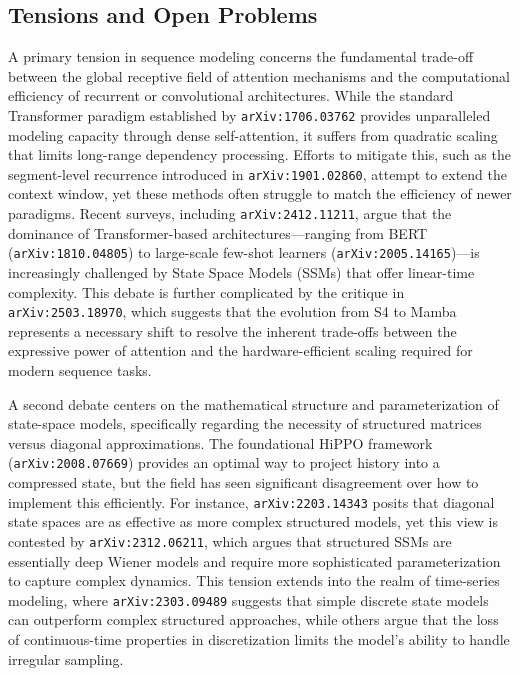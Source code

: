 \documentclass[11pt]{article}
\begin{document}
\subsection{Tensions and Open Problems}

A primary tension in sequence modeling concerns the fundamental trade-off between the global receptive field of attention mechanisms and the computational efficiency of recurrent or convolutional architectures. While the standard Transformer paradigm established by \texttt{arXiv:1706.03762} provides unparalleled modeling capacity through dense self-attention, it suffers from quadratic scaling that limits long-range dependency processing. Efforts to mitigate this, such as the segment-level recurrence introduced in \texttt{arXiv:1901.02860}, attempt to extend the context window, yet these methods often struggle to match the efficiency of newer paradigms. Recent surveys, including \texttt{arXiv:2412.11211}, argue that the dominance of Transformer-based architectures—ranging from BERT (\texttt{arXiv:1810.04805}) to large-scale few-shot learners (\texttt{arXiv:2005.14165})—is increasingly challenged by State Space Models (SSMs) that offer linear-time complexity. This debate is further complicated by the critique in \texttt{arXiv:2503.18970}, which suggests that the evolution from S4 to Mamba represents a necessary shift to resolve the inherent trade-offs between the expressive power of attention and the hardware-efficient scaling required for modern sequence tasks.

A second debate centers on the mathematical structure and parameterization of state-space models, specifically regarding the necessity of structured matrices versus diagonal approximations. The foundational HiPPO framework (\texttt{arXiv:2008.07669}) provides an optimal way to project history into a compressed state, but the field has seen significant disagreement over how to implement this efficiently. For instance, \texttt{arXiv:2203.14343} posits that diagonal state spaces are as effective as more complex structured models, yet this view is contested by \texttt{arXiv:2312.06211}, which argues that structured SSMs are essentially deep Wiener models and require more sophisticated parameterization to capture complex dynamics. This tension extends into the realm of time-series modeling, where \texttt{arXiv:2303.09489} suggests that simple discrete state models can outperform complex structured approaches, while others argue that the loss of continuous-time properties in discretization limits the model's ability to handle irregular sampling.
\end{document}
